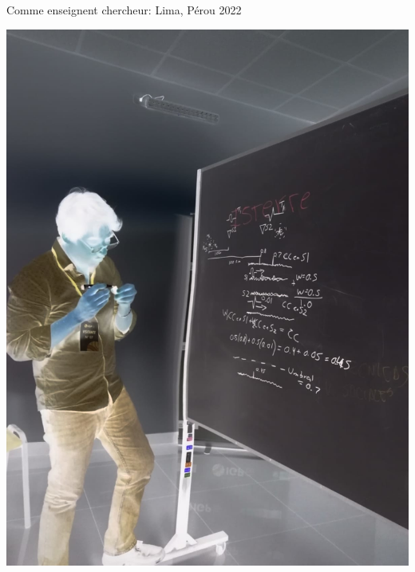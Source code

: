 \documentclass{beamer}
\begin{document}
\begin{frame}
 {Comme enseignent chercheur: Lima, Pérou 2022}
 
 \begin{minipage}{0.45\linewidth}
  \includegraphics[width=1\linewidth]{images/Lima1_neg.jpeg}   
 \end{minipage} \qquad
  \begin{minipage}{0.45\linewidth}

\end{minipage}
\end{frame}
\end{document}
